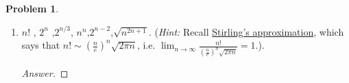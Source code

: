 \documentclass[11pt]{article}
\theoremstyle{definition}
\theoremstyle{definition}
\newtheorem{required}{Problem}
\theoremstyle{definition}
\begin{document}
\begin{required}
\begin{enumerate}[label=(\alph*)]
\subsection{Problem 13\ref{2b}}
        \item \label{2b} $n!$ , \qquad $2^n$ ,\qquad  $2^{n/3}$, \qquad  $n^n$,\qquad $2^{n-2}$,\qquad  $\sqrt{n^{2n+1}}$. (\emph{Hint:} Recall \href{https://en.wikipedia.org/wiki/Stirling\%27s_approximation}{Stirling's approximation}, which says that $n! \sim \left(\frac{n}{e}\right)^n \sqrt{2 \pi n}$, i.e. $\lim_{n \to \infty} \frac{n!}{\left(\frac{n}{e}\right)^n \sqrt{2 \pi n}} = 1$.).
        \begin{proof}[Answer]

        \end{proof}
\end{enumerate}

\end{required}

\newpage
\end{document}
